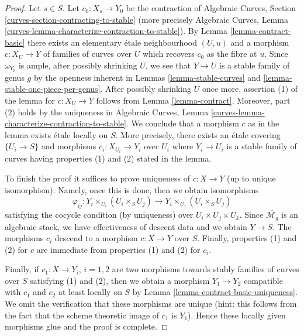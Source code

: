 \documentclass[10pt,a4paper]{amsart}
\theoremstyle{plain}
\theoremstyle{definition}
\theoremstyle{remark}
\numberwithin{equation}{subsection}
\begin{document}
\begin{proof}
Let $s \in S$. Let $c_0 : X_s \to Y_0$ be the contraction of
Algebraic Curves, Section \ref{curves-section-contracting-to-stable}
(more precisely Algebraic Curves, Lemma
\ref{curves-lemma-characterize-contraction-to-stable}).
By Lemma \ref{lemma-contract-basic}
there exists an elementary \'etale neighbourhood
$(U, u)$ and a morphism $c : X_U \to Y$
of families of curves over $U$ which recovers
$c_0$ as the fibre at $u$.
Since $\omega_{Y_0}$ is ample, after possibly shrinking $U$,
we see that $Y \to U$ is a stable family of genus $g$
by the openness inherent in
Lemmas \ref{lemma-stable-curves} and \ref{lemma-stable-one-piece-per-genus}.
After possibly shrinking $U$ once more, assertion (1) of the lemma for
$c : X_U \to Y$ follows from Lemma \ref{lemma-contract}.
Moreover, part (2) holds by the uniqueness in Algebraic Curves, Lemma
\ref{curves-lemma-characterize-contraction-to-stable}.
We conclude that a morphism $c$ as in the lemma exists \'etale locally
on $S$. More precisely, there exists an \'etale covering
$\{U_i \to S\}$ and morphisms $c_i : X_{U_i} \to Y_i$ over $U_i$
where $Y_i \to U_i$ is a stable family of curves
having properties (1) and (2) stated in the lemma.

\medskip\noindent
To finish the proof it suffices to prove uniqueness of $c : X \to Y$
(up to unique isomorphism). Namely, once this is done, then we
obtain isomorphisms
$$
\varphi_{ij} :
Y_i \times_{U_i} (U_i \times_S U_j)
\longrightarrow
Y_i \times_{U_j} (U_i \times_S U_j)
$$
satisfying the cocycle condition (by uniqueness) over
$U_i \times U_j \times U_k$. Since $\overline{\mathcal{M}_g}$
is an algebraic stack, we have effectiveness of descent data
and we obtain $Y \to S$. The morphisms $c_i$ descend to a morphism
$c : X \to Y$ over $S$. Finally, properties (1) and (2) for $c$
are immediate from properties (1) and (2) for $c_i$.

\medskip\noindent
Finally, if $c_1 : X \to Y_i$, $i = 1, 2$ are two morphisms towards
stably families of curves over $S$ satisfying (1) and (2), then
we obtain a morphism $Y_1 \to Y_2$ compatible with $c_1$ and $c_2$
at least locally on $S$ by Lemma \ref{lemma-contract-basic-uniqueness}.
We omit the verification that these morphisms are unique
(hint: this follows from the fact that the scheme theoretic image
of $c_1$ is $Y_1$). Hence these locally given morphisms glue
and the proof is complete.
\end{proof}
\end{document}
